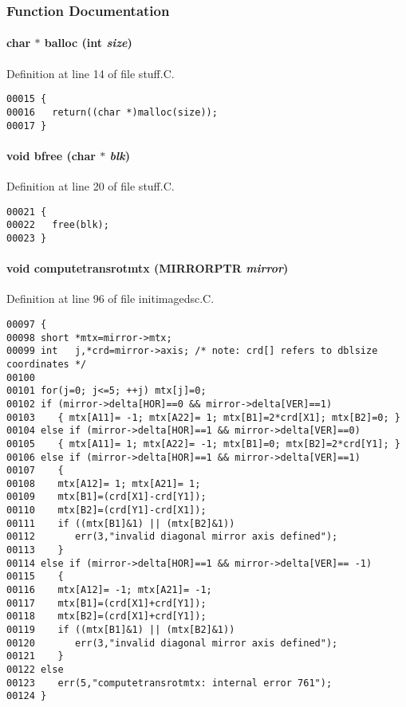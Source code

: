\subsubsection{Function Documentation}
\label{im.h_a0}
\paragraph{\setlength{\rightskip}{0pt plus 5cm}char $\ast$ balloc (int {\em size})}\hfill



Definition at line 14 of file stuff.C.\small\begin{verbatim}00015 {
00016   return((char *)malloc(size));
00017 }
\end{verbatim}\normalsize 
\label{im.h_a1}
\paragraph{\setlength{\rightskip}{0pt plus 5cm}void bfree (char $\ast$ {\em blk})}\hfill



Definition at line 20 of file stuff.C.\small\begin{verbatim}00021 {
00022   free(blk);
00023 }
\end{verbatim}\normalsize 
\label{im.h_a11}
\paragraph{\setlength{\rightskip}{0pt plus 5cm}void computetransrotmtx ({\bf MIRRORPTR} {\em mirror})}\hfill



Definition at line 96 of file initimagedsc.C.\small\begin{verbatim}00097 {
00098 short *mtx=mirror->mtx;
00099 int   j,*crd=mirror->axis; /* note: crd[] refers to dblsize coordinates */
00100 
00101 for(j=0; j<=5; ++j) mtx[j]=0;
00102 if (mirror->delta[HOR]==0 && mirror->delta[VER]==1)
00103    { mtx[A11]= -1; mtx[A22]= 1; mtx[B1]=2*crd[X1]; mtx[B2]=0; }
00104 else if (mirror->delta[HOR]==1 && mirror->delta[VER]==0)
00105    { mtx[A11]= 1; mtx[A22]= -1; mtx[B1]=0; mtx[B2]=2*crd[Y1]; }
00106 else if (mirror->delta[HOR]==1 && mirror->delta[VER]==1)
00107    {
00108    mtx[A12]= 1; mtx[A21]= 1;
00109    mtx[B1]=(crd[X1]-crd[Y1]);
00110    mtx[B2]=(crd[Y1]-crd[X1]);
00111    if ((mtx[B1]&1) || (mtx[B2]&1))
00112       err(3,"invalid diagonal mirror axis defined");
00113    }
00114 else if (mirror->delta[HOR]==1 && mirror->delta[VER]== -1)
00115    {
00116    mtx[A12]= -1; mtx[A21]= -1;
00117    mtx[B1]=(crd[X1]+crd[Y1]);
00118    mtx[B2]=(crd[X1]+crd[Y1]);
00119    if ((mtx[B1]&1) || (mtx[B2]&1))
00120       err(3,"invalid diagonal mirror axis defined");
00121    }
00122 else
00123    err(5,"computetransrotmtx: internal error 761");
00124 }
\end{verbatim}\normalsize 
\label{im.h_a10}
